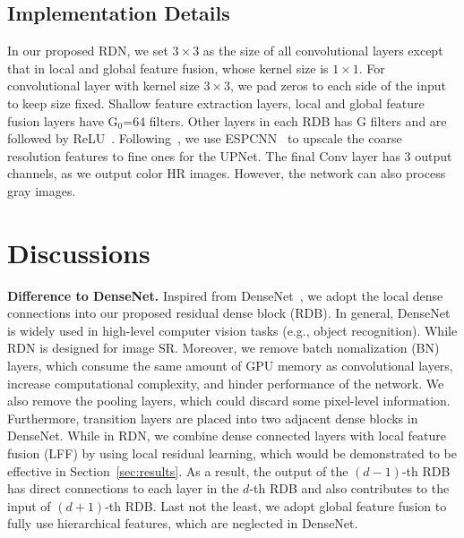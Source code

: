 \documentclass[10pt,twocolumn,letterpaper]{article}
\begin{document}
\subsection{Implementation Details}
\label{sec:implement}
In our proposed RDN, we set $3\times 3$ as the size of all convolutional layers except that in local and global feature fusion, whose kernel size is $1\times 1$. For convolutional layer with kernel size $3\times 3$, we pad zeros to each side of the input to keep size fixed. Shallow feature extraction layers, local and global feature fusion layers have G$_{0}$=64 filters. Other layers in each RDB has G filters and are followed by ReLU~\cite{glorot2011deep}. Following~\cite{lim2017enhanced}, we use ESPCNN~\cite{shi2016real} to upscale the coarse resolution features to fine ones for the UPNet. The final Conv layer has $3$ output channels, as we output color HR images. However, the network can also process gray images. 

\section{Discussions}
\label{sec:discussions}


\textbf{Difference to DenseNet.} Inspired from DenseNet~\cite{huang2017densely}, we adopt the local dense connections into our proposed residual dense block (RDB). In general, DenseNet is widely used in high-level computer vision tasks (e.g., object recognition). While RDN is designed for image SR. Moreover, we remove batch nomalization (BN) layers, which consume the same amount of GPU memory as convolutional layers, increase computational complexity, and hinder performance of the network. We also remove the pooling layers, which could discard some pixel-level information. Furthermore, transition layers are placed into two adjacent dense blocks in DenseNet. While in RDN, we combine dense connected layers with local feature fusion (LFF) by using local residual learning, which would be demonstrated to be effective in Section~\ref{sec:results}. As a result, the output of the $(d-1)$-th RDB has direct connections to each layer in the $d$-th RDB and also contributes to the input of $(d+1)$-th RDB. Last not the least, we adopt global feature fusion to fully use hierarchical features, which are neglected in DenseNet.  
\end{document}
